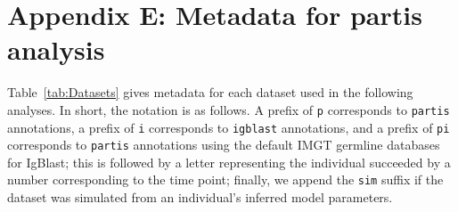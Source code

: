 \documentclass{article}
\begin{document}
\section*{Appendix E: Metadata for partis analysis}

Table~\ref{tab:Datasets} gives metadata for each dataset used in the following analyses.
In short, the notation is as follows.
A prefix of \texttt{p} corresponds to \texttt{partis} annotations, a prefix of \texttt{i} corresponds to \texttt{igblast} annotations, and a prefix of \texttt{pi} corresponds to \texttt{partis} annotations using the default IMGT germline databases for IgBlast;
this is followed by a letter representing the individual succeeded by a number corresponding to the time point;
finally, we append the \texttt{sim} suffix if the dataset was simulated from an individual's inferred model parameters.
\end{document}
